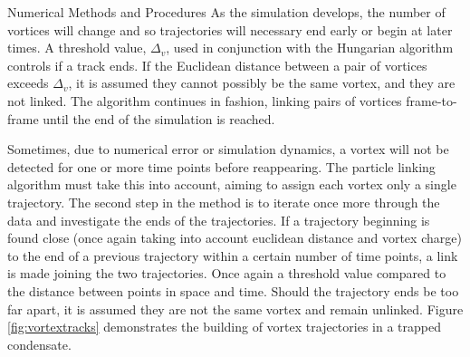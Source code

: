 \begin{chapter}{\label{cha:numerics}Numerical Methods and Procedures}
As the simulation develops, the number of vortices will change and so trajectories will necessary end early or begin at later times. A threshold value, $\Delta_v$, used in conjunction with the Hungarian algorithm controls if a track ends. If the Euclidean distance between a pair of vortices exceeds $\Delta_v$, it is assumed they cannot possibly be the same vortex, and they are not linked. The algorithm continues in fashion, linking pairs of vortices frame-to-frame until the end of the simulation is reached.

Sometimes, due to numerical error or simulation dynamics, a vortex will not be detected for one or more time points before reappearing. The particle linking algorithm must take this into account, aiming to assign each vortex only a single trajectory. The second step in the method is to iterate once more through the data and investigate the ends of the trajectories. If a trajectory beginning is found close (once again taking into account euclidean distance and vortex charge) to the end of a previous trajectory within a certain number of time points, a link is made joining the two trajectories. Once again a threshold value compared to the distance between points in space and time. Should the trajectory ends be too far apart, it is assumed they are not the same vortex and remain unlinked. Figure \ref{fig:vortextracks} demonstrates the building of vortex trajectories in a trapped condensate.
\begin{figure}[!ht]
\begin{center}
\end{center}
\end{figure}
\end{chapter}
